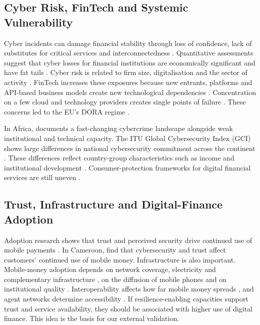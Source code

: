\documentclass[fintech,article,submit,pdftex,moreauthors]{Definitions/mdpi}
\begin{document}
\subsection{Cyber Risk, FinTech and Systemic Vulnerability}

Cyber incidents can damage financial stability through loss of confidence, lack of substitutes for critical services and interconnectedness \citep{Kopp2017}. Quantitative assessments suggest that cyber losses for financial institutions are economically significant and have fat tails \citep{Bouveret2018,Bouveret2019}. Cyber risk is related to firm size, digitalisation and the sector of activity \citep{Aldasoro2022}. FinTech increases these exposures because new entrants, platforms and API-based business models create new technological dependencies \citep{Gomber2018,Chen2022,Vucinic2022}. Concentration on a few cloud and technology providers creates single points of failure \citep{Gulliver2023,FSB2023}. These concerns led to the EU's DORA regime \citep{EU2022DORA}.

In Africa, \citet{Kshetri2019} documents a fast-changing cybercrime landscape alongside weak institutional and technical capacity. The ITU Global Cybersecurity Index (GCI) shows large differences in national cybersecurity commitment across the continent \citep{ITU2024GCI}. These differences reflect country-group characteristics such as income and institutional development \citep{Donalds2022}. Consumer-protection frameworks for digital financial services are still uneven \citep{DiCastri2023}.

\subsection{Trust, Infrastructure and Digital-Finance Adoption}

Adoption research shows that trust and perceived security drive continued use of mobile payments \citep{Cao2018}. In Cameroon, \citet{Mvogo2026} find that cybersecurity and trust affect customers' continued use of mobile money. Infrastructure is also important. Mobile-money adoption depends on network coverage, electricity and complementary infrastructure \citep{Mothobi2017}, on the diffusion of mobile phones and on institutional quality \citep{Lashitew2019}. Interoperability affects how far mobile money spreads \citep{Brunnermeier2023}, and agent networks determine accessibility \citep{Johnen2023}. If resilience-enabling capacities support trust and service availability, they should be associated with higher use of digital finance. This idea is the basis for our external validation.
\end{document}
